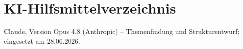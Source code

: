 \section{KI-Hilfsmittelverzeichnis}\label{anh:kihilfsmittel}
Claude, Version Opus 4.8 (Anthropic) -- Themenfindung und Strukturentwurf; eingesetzt am 28.06.2026.
